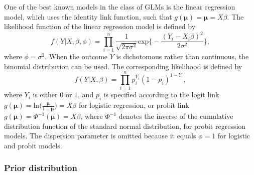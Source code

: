 \documentclass[review, 3p, authoryear]{elsarticle} %
\begin{document}
One of the best known models in the class of GLMs is the linear regression model, which uses the identity link function, such that \(g(\boldsymbol{\mu}) = \boldsymbol{\mu} = X\beta\).
The likelihood function of the linear regression model is defined by
\[
f(Y | X, \beta, \phi) = \prod^n_{i=1} \frac{1}{\sqrt{2\pi\sigma^2}} \text{exp}
\Bigg\{
- \frac{(Y_i - X_i\beta)^2}{2\sigma^2}
\Bigg\},
\]
where \(\phi = \sigma^2\).
When the outcome \(Y\) is dichotomous rather than continuous, the binomial distribution can be used.
The corresponding likelihood is defined by
\[
f(Y|X, \beta) = \prod^n_{i=1} p_i^{Y_i} (1 - p_i)^{1 - Y_i},
\]
where \(Y_i\) is either \(0\) or \(1\), and \(p_i\) is specified according to the logit link \(g(\boldsymbol{\mu}) = \text{ln}\Big(\frac{\boldsymbol{\mu}}{1 - \boldsymbol{\mu}}\Big) = X\beta\) for logistic regression, or probit link \(g(\boldsymbol{\mu}) = \Phi^{-1}(\boldsymbol{\mu}) = X\beta\), where \(\Phi^{-1}\) denotes the inverse of the cumulative distribution function of the standard normal distribution, for probit regression models.
The dispersion parameter is omitted because it equals \(\phi = 1\) for logistic and probit models.

\hypertarget{prior-distribution}{%
\subsubsection{Prior distribution}\label{prior-distribution}}
\end{document}
